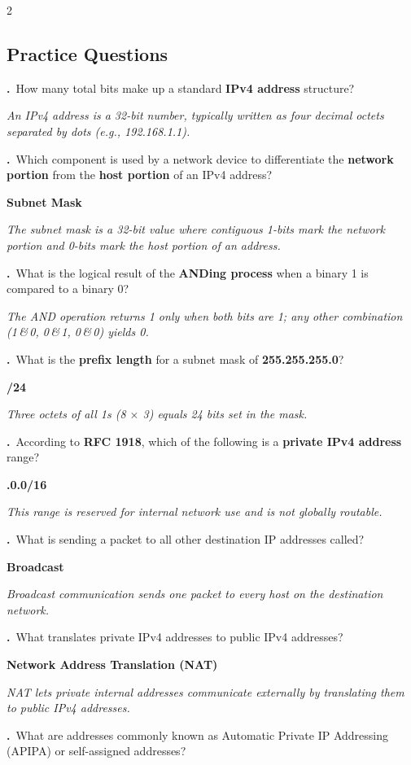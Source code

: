 \documentclass[9pt]{article}
\newcommand{\answer}[1]{%
  \par\nobreak\vspace{1pt}%
  \begin{tcolorbox}[
    colback=AnswerRed,
    colframe=AnswerRed,
    boxrule=0pt,
    arc=0pt,
    left=4pt, right=4pt,
    top=0.5pt, bottom=0.5pt,
    before skip=0pt,
    after skip=0pt
  ]
  {\footnotesize\bfseries\color{white}\RaggedRight #1}
  \end{tcolorbox}
}
\newcommand{\hl}[1]{\textbf{\textcolor{themeColor}{#1}}}
\newcommand{\explain}[1]{%
  \par\nobreak\vspace{0pt}%
  \begin{tcolorbox}[
    colback=LightBlueBg,
    colframe=SoftBlue!30,
    boxrule=0.3pt,
    arc=2pt,
    left=4pt, right=4pt,
    top=1pt, bottom=1pt,
    before skip=1pt,
    after skip=2pt
  ]
  {\footnotesize\color{MutedGray}\RaggedRight\itshape #1}
  \end{tcolorbox}
}
\newcounter{qnum}
\newcommand{\question}[1]{%
  \Needspace{4\baselineskip}%
  \stepcounter{qnum}%
  \par\vspace{3pt}%
  {\footnotesize\bfseries\color{themeColor}\theqnum.}\ {\footnotesize #1}%
}
\newcommand{\questioncolumns}[1]{%
  \begin{multicols}{2}
  \subsection*{Practice Questions}
  #1
  \end{multicols}
}
\begin{document}
\questioncolumns{
\question{How many total bits make up a standard \hl{IPv4 address} structure?}

\answer{32}

\explain{An IPv4 address is a 32-bit number, typically written as four decimal octets separated by dots (e.g., 192.168.1.1).}


\question{Which component is used by a network device to differentiate the \hl{network portion} from the \hl{host portion} of an IPv4 address?}

\answer{Subnet Mask}

\explain{The subnet mask is a 32-bit value where contiguous 1-bits mark the network portion and 0-bits mark the host portion of an address.}


\question{What is the logical result of the \hl{ANDing process} when a binary 1 is compared to a binary 0?}

\answer{0}

\explain{The AND operation returns 1 only when both bits are 1; any other combination (1\,\&\,0, 0\,\&\,1, 0\,\&\,0) yields 0.}


\question{What is the \hl{prefix length} for a subnet mask of \hl{255.255.255.0}?}

\answer{/24}

\explain{Three octets of all 1s (8 $\times$ 3) equals 24 bits set in the mask.}


\question{According to \hl{RFC 1918}, which of the following is a \hl{private IPv4 address} range?}

\answer{192.168.0.0/16}

\explain{This range is reserved for internal network use and is not globally routable.}


\question{What is sending a packet to all other destination IP addresses called?}

\answer{Broadcast}

\explain{Broadcast communication sends one packet to every host on the destination network.}


\question{What translates private IPv4 addresses to public IPv4 addresses?}

\answer{Network Address Translation (NAT)}

\explain{NAT lets private internal addresses communicate externally by translating them to public IPv4 addresses.}


\question{What are addresses commonly known as Automatic Private IP Addressing (APIPA) or self-assigned addresses?}

}
\end{document}

